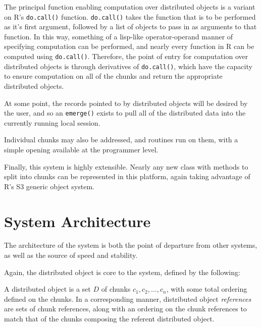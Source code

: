 \documentclass[a4paper,10pt]{article}
\begin{document}
The principal function enabling computation over distributed objects is a
variant on R's \texttt{do.call()} function.
\texttt{do.call()} takes the function that is to be performed as it's first
argument, followed by a list of objects to pass in as arguments to that
function.
In this way, something of a lisp-like operator-operand manner of specifying
computation can be performed, and nearly every function in R can be computed
using \texttt{do.call()}.
Therefore, the point of entry for computation over distributed objects is
through derivatives of \texttt{do.call()}, which have the capacity to
ensure computation on all of the chunks and return the appropriate distributed
objects.

At some point, the records pointed to by distributed objects will be desired by
the user, and so an \texttt{emerge()} exists to pull all of the distributed
data into the currently running local session.

Individual chunks may also be addressed, and routines run on them, with a
simple opening available at the programmer level.

Finally, this system is highly extensible.
Nearly any new class with methods to split into chunks can be represented in
this platform, again taking advantage of R's S3 generic object system.

\section{System Architecture}\label{sec:sys-arch}

The architecture of the system is both the point of departure from other systems, as well as the source of speed and stability.

Again, the distributed object is core to the system, defined by the following:

\begin{defn}
	\label{distobj}
	A distributed object is a set \(D\) of chunks \(c_1, c_2, \dots, c_n\),
	with some total ordering defined on the chunks.
	In a corresponding manner, distributed object \textit{references} are
	sets of chunk references, along with an ordering on the chunk
	references to match that of the chunks composing the referent
	distributed object.
\end{defn}
\end{document}
